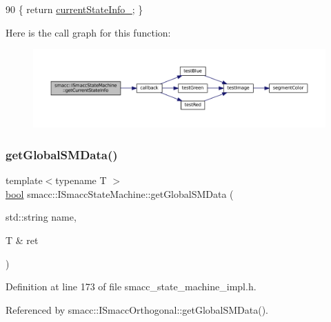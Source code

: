 \begin{DoxyCode}
90 \{ \textcolor{keywordflow}{return} \hyperlink{classsmacc_1_1ISmaccStateMachine_a95e42f735cecdc231ad5372bf9fe7eaf}{currentStateInfo\_}; \}
\end{DoxyCode}
Here is the call graph for this function\+:
\nopagebreak
\begin{figure}[H]
\begin{center}
\leavevmode
\includegraphics[width=350pt]{classsmacc_1_1ISmaccStateMachine_a4738679e8e5f7adab35e610dce0bfff7_cgraph}
\end{center}
\end{figure}
\mbox{\label{classsmacc_1_1ISmaccStateMachine_aeda2d6813c6c428bf318a5792e014b61}} 
\subsubsection{\texorpdfstring{get\+Global\+S\+M\+Data()}{getGlobalSMData()}}
{\footnotesize\ttfamily template$<$typename T $>$ \\
\hyperlink{classbool}{bool} smacc\+::\+I\+Smacc\+State\+Machine\+::get\+Global\+S\+M\+Data (\begin{DoxyParamCaption}\item[{std\+::string}]{name,  }\item[{T \&}]{ret }\end{DoxyParamCaption})}



Definition at line 173 of file smacc\+\_\+state\+\_\+machine\+\_\+impl.\+h.



Referenced by smacc\+::\+I\+Smacc\+Orthogonal\+::get\+Global\+S\+M\+Data().


